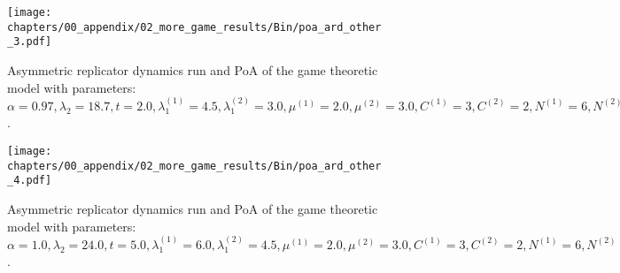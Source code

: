 \begin{figure}[H]
    \texttt{[image: chapters/00\_appendix/02\_more\_game\_results/Bin/poa\_ard\_other\_3.pdf]}
    \caption{Asymmetric replicator dynamics run and PoA of the game theoretic
    model with parameters: \(\alpha = 0.97, \lambda_2 = 18.7, t = 2.0,
    \lambda_1^{(1)} = 4.5, \lambda_1^{(2)} = 3.0, \mu^{(1)} = 2.0,
    \mu^{(2)} = 3.0, C^{(1)} = 3, C^{(2)} = 2, N^{(1)} = 6, N^{(2)} = 7,
    M^{(1)} = 5, M^{(2)} = 4\).}
    \label{fig:poa_ard_other_3}
\end{figure}



\begin{figure}[H]
    \texttt{[image: chapters/00\_appendix/02\_more\_game\_results/Bin/poa\_ard\_other\_4.pdf]}
    \caption{Asymmetric replicator dynamics run and PoA of the game theoretic
    model with parameters: \(\alpha = 1.0, \lambda_2 = 24.0, t = 5.0,
    \lambda_1^{(1)} = 6.0, \lambda_1^{(2)} = 4.5, \mu^{(1)} = 2.0,
    \mu^{(2)} = 3.0, C^{(1)} = 3, C^{(2)} = 2, N^{(1)} = 6, N^{(2)} = 7,
    M^{(1)} = 5, M^{(2)} = 4\).}
    \label{fig:poa_ard_other_4}
\end{figure}

